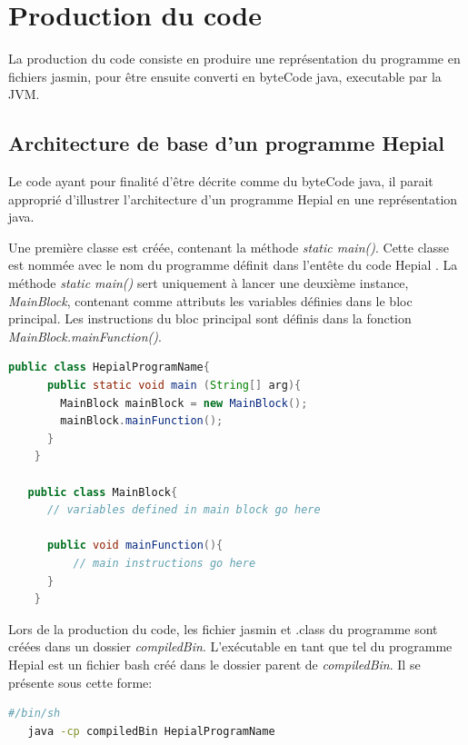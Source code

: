 \documentclass[11pt,a4paper]{article}
\begin{document}
  \section{Production du code}
  
  \par La production du code consiste en produire une représentation du programme en fichiers jasmin, pour être ensuite converti en byteCode java, executable par la JVM. 
  
  \subsection{Architecture de base d'un programme Hepial}
  
  \par Le code ayant pour finalité d'être décrite comme du byteCode java, il parait approprié d'illustrer l'architecture d'un programme Hepial en une représentation java. 
  
  \par Une première classe est créée, contenant la méthode \textit{static main()}. Cette classe est nommée avec le nom du programme définit dans l'entête du code Hepial . La méthode \textit{static main()} sert uniquement à lancer une deuxième instance, \textit{MainBlock}, contenant comme attributs les variables définies dans le bloc principal. Les instructions du bloc principal sont définis dans la fonction \textit{MainBlock.mainFunction()}.
  
    \begin{lstlisting}[language=java,caption={Architecture de base d'un programme Hepial}]
    public class HepialProgramName{
      public static void main (String[] arg){
        MainBlock mainBlock = new MainBlock();
        mainBlock.mainFunction();
      }
    }
    
   public class MainBlock{
      // variables defined in main block go here
   
      public void mainFunction(){
          // main instructions go here
      }
    }
   \end{lstlisting}  
   
  \par Lors de la production du code, les fichier jasmin et .class du programme sont créées dans un dossier \textit{compiledBin}. L'exécutable en tant que tel du programme Hepial est un fichier bash créé dans le dossier parent de \textit{compiledBin}. Il se présente sous cette forme: 
  
  \begin{lstlisting}[language=bash,caption={Exécutable programme Hepial}]
   #/bin/sh
   java -cp compiledBin HepialProgramName
   \end{lstlisting}    
  
\end{document}
